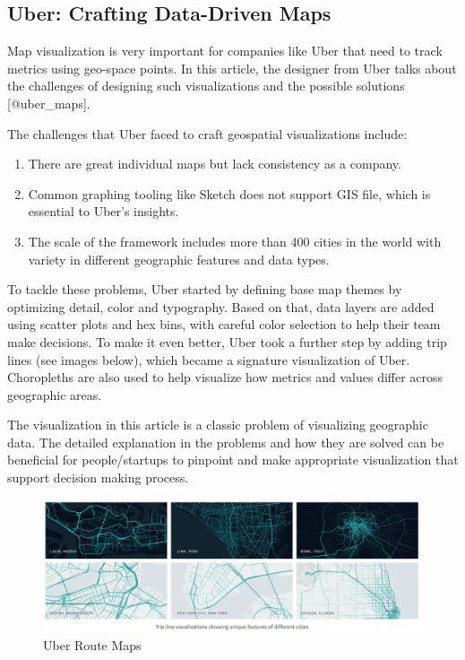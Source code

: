 \documentclass[]{book}
\providecommand{\tightlist}{%
  \setlength{\itemsep}{0pt}\setlength{\parskip}{0pt}}
\theoremstyle{definition}
\theoremstyle{definition}
\theoremstyle{definition}
\theoremstyle{remark}
\begin{document}
\subsection{Uber: Crafting Data-Driven
Maps}\label{uber-crafting-data-driven-maps}

Map visualization is very important for companies like Uber that need to
track metrics using geo-space points. In this article, the designer from
Uber talks about the challenges of designing such visualizations and the
possible solutions {[}@uber\_maps{]}.

The challenges that Uber faced to craft geospatial visualizations
include:

\begin{enumerate}
\def\labelenumi{\arabic{enumi}.}
\tightlist
\item
  There are great individual maps but lack consistency as a company.
\item
  Common graphing tooling like Sketch does not support GIS file, which
  is essential to Uber's insights.
\item
  The scale of the framework includes more than 400 cities in the world
  with variety in different geographic features and data types.
\end{enumerate}

To tackle these problems, Uber started by defining base map themes by
optimizing detail, color and typography. Based on that, data layers are
added using scatter plots and hex bins, with careful color selection to
help their team make decisions. To make it even better, Uber took a
further step by adding trip lines (see images below), which became a
signature visualization of Uber. Choropleths are also used to help
visualize how metrics and values differ across geographic areas.

The visualization in this article is a classic problem of visualizing
geographic data. The detailed explanation in the problems and how they
are solved can be beneficial for people/startups to pinpoint and make
appropriate visualization that support decision making process.

\begin{figure}
\centering
\includegraphics{images/uber_mapping.png}
\caption{Uber Route Maps}
\end{figure}
\end{document}
